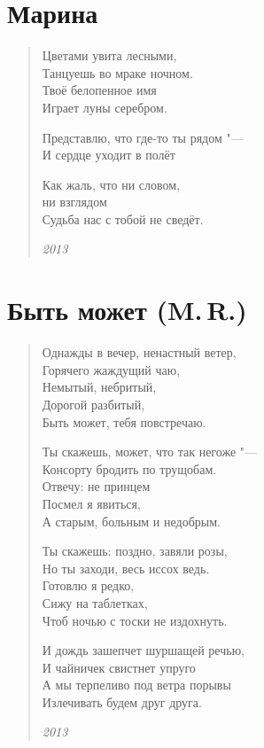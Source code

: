 \documentclass[a4paper,12pt]{article}
\newcommand{\ldotst}{\so{...}\xspace}
\begin{document}
\section{Марина}

\begin{verse}
Цветами увита лесными,\\
Танцуешь во мраке ночном.\\
Твоё белопенное имя\\
Играет луны серебром.

Представлю, что где-то ты рядом "---\\
И сердце уходит в полёт\ldotst

Как жаль, что ни словом,\\
ни взглядом\\
Судьба нас с тобой не сведёт.

\emph{2013}
\end{verse}
\newpage

\section{Быть может (M.\,R.)}

\begin{verse}
Однажды в вечер, ненастный ветер,\\
Горячего жаждущий чаю,\\
Немытый, небритый,\\
Дорогой разбитый,\\
Быть может, тебя повстречаю.

Ты скажешь, может, что так негоже "---\\
Консорту бродить по трущобам.\\
Отвечу: не принцем\\
Посмел я явиться,\\
А старым, больным и недобрым.

Ты скажешь: поздно, завяли розы,\\
Но ты заходи, весь иссох ведь.\\
Готовлю я редко,\\
Сижу на таблетках,\\
Чтоб ночью с тоски не издохнуть.

И дождь зашепчет шуршащей речью,\\
И чайничек свистнет упруго\ldotst\\
А мы терпеливо под ветра порывы\\
Излечивать будем друг друга.

\emph{2013}
\end{verse}
\newpage
\end{document}
